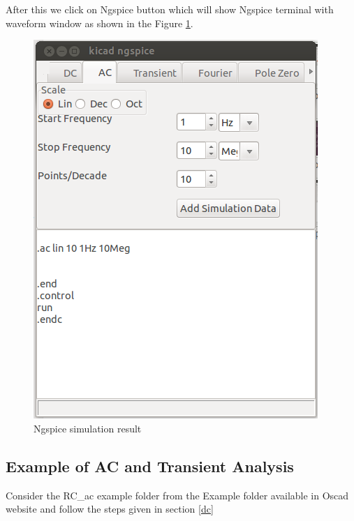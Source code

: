After this we click on Ngspice button which will show Ngspice terminal with waveform window as shown in the Figure \ref{15}.
\begin{figure}
\centering
\includegraphics[width=\textwidth]{figures/15}
\caption{Ngspice simulation result}
\label{15}
\end{figure}
\subsection{Example of AC and Transient Analysis}
Consider the RC\_ac example folder from the Example folder available in Oscad website and follow the steps given in section \ref{dc}

